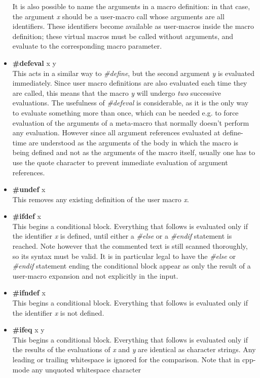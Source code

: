 \begin{itemize}
It is also possible to name the arguments in a macro definition: in
that case, the argument {\it x} should be a user-macro call whose arguments
are all identifiers. These identifiers become available as user-macros
inside the macro definition; these virtual macros must be called without
arguments, and evaluate to the corresponding macro parameter.
\item
{\bf \#defeval } x y\\
This acts in a similar way to {\it \#define}, but the second argument {\it y}
is evaluated immediately. Since user macro definitions are also evaluated
each time they are called, this means that the macro {\it y} will undergo
{\it two} successive evaluations. The usefulness of {\it \#defeval} is   
considerable, as it is the only way to evaluate something more than once,
which can be needed e.g. to force evaluation of the arguments of a 
meta-macro that normally doesn't perform any evaluation. However since all 
argument references evaluated at define-time are understood as the arguments 
of the body in which the macro is being defined and not as the arguments of 
the macro itself, usually one has to use the quote character to prevent 
immediate evaluation of argument references.
\item
{\bf \#undef } x\\
This removes any existing definition of the user macro {\it x}.
\item
{\bf \#ifdef } x\\
This begins a conditional block. Everything that follows is evaluated only
if the identifier {\it x} is defined, until either a {\it \#else} or a
{\it \#endif} statement is reached. Note however that the commented text is
still scanned thoroughly, so its syntax must be valid. It is in particular
legal to have the {\it \#else} or {\it \#endif} statement ending the conditional 
block appear as only the result of a user-macro expansion and not explicitly
in the input.
\item
{\bf \#ifndef } x\\
This begins a conditional block. Everything that follows is evaluated only
if the identifier {\it x} is not defined.
\item
{\bf \#ifeq } x y\\
This begins a conditional block. Everything that follows is evaluated
only if the results of the evaluations of {\it x} and {\it y} are identical
as character strings. Any leading or trailing whitespace is ignored for 
the comparison. Note that in cpp-mode any unquoted whitespace character

\end{itemize}
